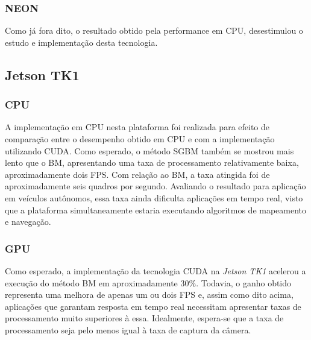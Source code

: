 \subsubsection{NEON}
Como já fora dito, o resultado obtido pela performance em CPU, desestimulou o estudo e implementação desta tecnologia.


\subsection{Jetson TK1}
\subsubsection{CPU}
A implementação em CPU nesta plataforma foi realizada para efeito de comparação entre o desempenho obtido em CPU e com a implementação utilizando CUDA. Como esperado, o método SGBM também se mostrou mais lento que o BM, apresentando uma taxa de processamento relativamente baixa, aproximadamente dois FPS. Com relação ao BM, a taxa atingida foi de aproximadamente seis quadros por segundo. Avaliando o resultado para aplicação em veículos autônomos, essa taxa ainda dificulta aplicações em tempo real, visto que a plataforma simultaneamente estaria executando algoritmos de mapeamento e navegação.

\subsubsection{GPU}
Como esperado, a implementação da tecnologia CUDA na \textit{Jetson TK1} acelerou a execução do método BM em aproximadamente 30\%. Todavia, o ganho obtido representa uma melhora de apenas um ou dois FPS e, assim como dito acima, aplicações que garantam resposta em tempo real necessitam apresentar taxas de processamento muito superiores à essa. Idealmente, espera-se que a taxa de processamento seja pelo menos igual à taxa de captura da câmera.
